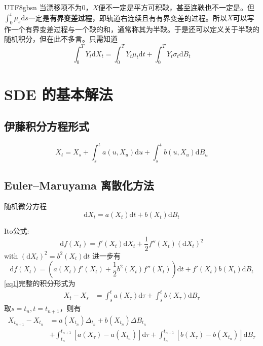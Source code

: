 \documentclass{article}
\begin{document}
\begin{CJK*}{UTF8}{gbsn}
当漂移项不为$0$，$X$便不一定是平方可积鞅，甚至连鞅也不一定是。但$\int_0^t\mu_s\mathrm{d}s$一定是\textbf{有界变差过程}，即轨道右连续且有有界变差的过程。所以$X$可以写作一个有界变差过程与一个鞅的和，通常称其为半鞅。于是还可以定义关于半鞅的随机积分，但在此不多言。只需知道
$$
\int_0^TY_t\mathrm{d}X_t=\int_0^TY_t\mu_t\mathrm{d}t+\int_0^TY_t\sigma_t\mathrm{d}B_t
$$

\section{SDE 的基本解法}
\subsection{伊藤积分方程形式}
$$
X_t=X_s+\int_s^ta(u,X_u)\mathrm{d}u+\int_s^t b(u,X_u)\mathrm{d}B_u
$$

\subsection{Euler--Maruyama 离散化方法}
随机微分方程
\begin{equation}
    \mathrm{d}X_t=a(X_t)\mathrm{d}t+b(X_t)\mathrm{d}B_t\label{eq1}
\end{equation}

Ito公式:
$$
    \mathrm{d}f(X_t)=f'(X_t)\mathrm{d}X_t+\frac{1}{2}f''(X_t)(\mathrm{d}X_t)^2
$$
with $(\mathrm{d}X_t)^2=b^2(X_t)\mathrm{d}t$
进一步有
\begin{equation}
    \mathrm{d}f(X_t)=\left(a(X_t)f'(X_t)+\frac{1}{2}b^2(X_t)f''(X_t)\right)\mathrm{d}t+f'(X_t)b(X_t)\mathrm{d}B_t
\label{eq2}\end{equation}
\ref{eq1}完整的积分形式为
$$\begin{aligned}
    X_t-X_s
    &=\int_s^t a(X_\tau)\mathrm{d}\tau+\int_s^tb(X_\tau)\mathrm{d}B_\tau
    \end{aligned}
$$
取$s=t_{n},t=t_{n+1}$，则有
\begin{equation}
    \begin{aligned}
        X_{t_{n+1}}-X_{t_n}
        &=a(X_{t_n})\Delta_{t_n}+b(X_{t_{n}})\Delta B_{t_n}\\
        &+\int_{t_{n}}^{t_{n+1}}[a(X_\tau)-a(X_{t_{n}})]\mathrm{d}\tau
        +\int_{t_{n}}^{t_{n+1}}[b(X_\tau)-b(X_{t_{n}})]\mathrm{d}B_\tau
    \end{aligned}\label{eq3}
\end{equation}


\end{CJK*}
\end{document}
